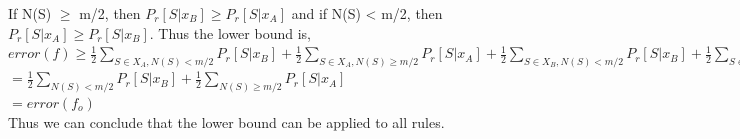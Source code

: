 \documentclass[10pt]{article}
\begin{document}
\begin{flushleft}
\vspace{0.5em}
If N(S) $\geq$ m/2, then $P_{r}[S \lvert x_{B}] \geq P_{r}[S \lvert x_{A}]$ and if N(S) < m/2, then $P_{r}[S \lvert x_{A}] \geq P_{r}[S \lvert x_{B}]$. Thus the lower bound is, \\
\vspace{0.5em}
\hspace{2em} $error(f) \geq \frac{1}{2} \sum\limits_{S \in X_{A}, N(S)< m/2} P_{r} [S \lvert x_{B}] + \frac{1}{2} \sum\limits_{S \in X_{A}, N(S) \geq m/2} P_{r}[S \lvert x_{A}] + \frac{1}{2} \sum\limits_{S \in X_{B}, N(S)< m/2} P_{r} [S \lvert x_{B}] + \frac{1}{2} \sum\limits_{S \in X_{B}, N(S) \geq m/2} P_{r}[S \lvert x_{A}]$\\
\hspace{2em} \hspace{3.4em} $ = \frac{1}{2} \sum\limits_{N(S) <m/2} P_{r}[S \lvert x_{B}] + \frac{1}{2} \sum\limits_{N(S) \geq m/2} P_{r}[S \lvert x_{A}]$\\
\hspace{2em} \hspace{3.4em} $ = error(f_{o})$\\
\vspace{0.5em}
Thus we can conclude that the lower bound can be applied to all rules.
\end{flushleft}
\end{document}
